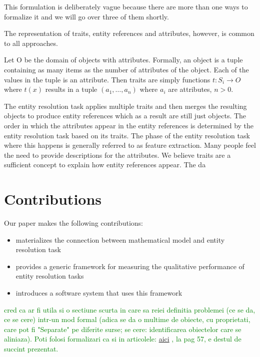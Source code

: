 \documentclass[11pt]{article}
\begin{document}
    This formulation is deliberately vague because there are more than one ways
    to formalize it and we will go over three of them shortly.
    
    The representation of traits, entity references and attributes, however, is
    common to all approaches.

    Let O be the domain of objects with attributes.
    Formally, an object is a tuple containing as many items as the number of
    attributes of the object.
    Each of the values in the tuple is an attribute.
    Then traits are simply functions $t:S_i	\rightarrow O$ where $t(x)$ results in a tuple
    $(a_1, \ldots, a_n)$ where $a_i$ are attributes, $n > 0$.
    
    The entity resolution task applies multiple traits and then merges the
    resulting objects to produce entity references which as a result are still
    just objects.
    The order in which the attributes appear in the entity references
    is determined by the entity resolution task based on its traits.
    The phase of the entity resolution task where this happens is generally
    referred to as feature extraction.
    Many people feel the need to provide descriptions for the attributes.
    We believe traits are a sufficient concept to explain how entity references
    appear.
    The da


    \section{Contributions}\label{sec:contributions}

    Our paper makes the following contributions:

    \begin{itemize}
        \item materializes the connection between mathematical model and entity
        resolution task
        \item provides a generic framework for measuring the qualitative
        performance of entity resolution tasks
        \item introduces a software system that uses this framework
    \end{itemize}
    
    \textcolor{green}{cred ca ar fi utila si o sectiune scurta in care sa reiei definitia problemei (ce se da, ce se
    cere) intr-un mod formal (adica se da o multime de obiecte, cu proprietati, care pot fi "Separate" pe diferite
    surse; se cere: identificarea obiectelor care se aliniaza). Poti folosi formalizari ca si in articolele:}
    \href{https://d1wqtxts1xzle7.cloudfront.net/30672623/A11SEP-CD-libre.pdf?1391815744=&response-content-disposition=inline%3B+filename%3DA_Uniform_Dependency_Language_for_Improv.pdf&Expires=1693931642&Signature=G-sCf5o-XZNgP~WX0yxCtzzbvCqj4~Tu4dka6QLKrOk6zPZ5XTrOZD5kqcQxJJa48w5-2Ya31rd4b~BV1bR5kJMwuFcsGzAPcQqDhpRhVxoki41kZUSYU73pVTcfyqeE3l7gTg6Qriuowj8xM3LgHfHUft80iguUhSMUDmC2FLg7WGjHWETeKquMv51t9sKpyIQHG11wggW2XMkcx1tygkd92b339bqEX-urQhQN9irKBou-dmrJvF2O7qb2LxZsb4fwYLvwi0vOZ6fzVguOdsRIcqm6uzdmQn3tPV1oMpcx4Qy6q-dUWNm4uzJZ9PbzW5Wo351FXZVogeepZGXFcw__&Key-Pair-Id=APKAJLOHF5GGSLRBV4ZA#page=53}{aici}
    \textcolor{green}{, la pag 57, e destul de succint prezentat.}
\end{document}

